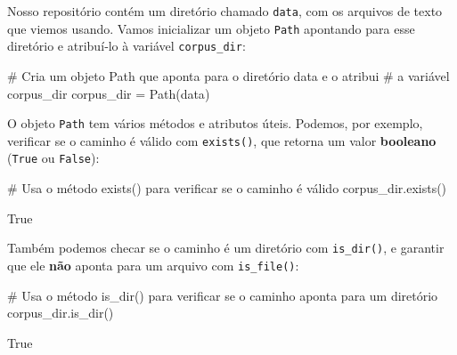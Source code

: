 \documentclass[
  brazilian,
  11pt,
]{article}
\newenvironment{Shaded}{\begin{snugshade}}{\end{snugshade}}
\newcommand{\CommentTok}[1]{\textcolor[rgb]{0.48,0.49,0.49}{#1}}
\newcommand{\NormalTok}[1]{\textcolor[rgb]{0.81,0.81,0.76}{#1}}
\newcommand{\OperatorTok}[1]{\textcolor[rgb]{0.81,0.81,0.76}{#1}}
\newcommand{\StringTok}[1]{\textcolor[rgb]{0.96,0.31,0.31}{#1}}
\let\oldtexttt\texttt
\renewcommand{\texttt}[1]{{\color{inlink}\oldtexttt{#1}}}
\begin{document}
Nosso repositório contém um diretório chamado \texttt{data}, com os
arquivos de texto que viemos usando. Vamos inicializar um objeto
\texttt{Path} apontando para esse diretório e atribuí‑lo à variável
\texttt{corpus\_dir}:

\begin{Shaded}
\begin{Highlighting}[]
\CommentTok{\# Cria um objeto Path que aponta para o diretório \textquotesingle{}data\textquotesingle{} e o atribui}
\CommentTok{\# a variável \textquotesingle{}corpus\_dir\textquotesingle{}}
\NormalTok{corpus\_dir }\OperatorTok{=}\NormalTok{ Path(}\StringTok{\textquotesingle{}data\textquotesingle{}}\NormalTok{)}
\end{Highlighting}
\end{Shaded}

O objeto \texttt{Path} tem vários métodos e atributos úteis. Podemos,
por exemplo, verificar se o caminho é válido com \texttt{exists()}, que
retorna um valor \textbf{booleano} (\texttt{True} ou \texttt{False}):

\begin{Shaded}
\begin{Highlighting}[]
\CommentTok{\# Usa o método exists() para verificar se o caminho é válido}
\NormalTok{corpus\_dir.exists()}
\end{Highlighting}
\end{Shaded}

\begin{Shaded}
\begin{Highlighting}[]
\NormalTok{True}
\end{Highlighting}
\end{Shaded}

Também podemos checar se o caminho é um diretório com
\texttt{is\_dir()}, e garantir que ele \textbf{não} aponta para um
arquivo com \texttt{is\_file()}:

\begin{Shaded}
\begin{Highlighting}[]
\CommentTok{\# Usa o método is\_dir() para verificar se o caminho aponta para um diretório}
\NormalTok{corpus\_dir.is\_dir()}
\end{Highlighting}
\end{Shaded}

\begin{Shaded}
\begin{Highlighting}[]
\NormalTok{True}
\end{Highlighting}
\end{Shaded}
\end{document}
